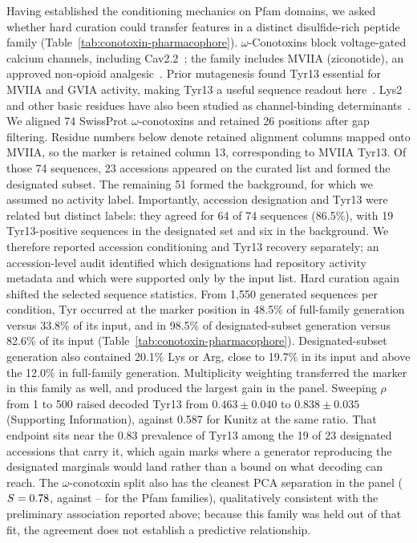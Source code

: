 Having established the conditioning mechanics on Pfam domains, we asked whether hard curation
could transfer features in a distinct disulfide-rich peptide family
(Table~\ref{tab:conotoxin-pharmacophore}). $\omega$-Conotoxins block
voltage-gated calcium channels, including Cav2.2~\cite{omegaConotoxinSAR2006}; the family
includes MVIIA (ziconotide), an approved non-opioid analgesic~\cite{ziconotideReview2004}.
Prior mutagenesis found Tyr13 essential for MVIIA and GVIA activity, making
Tyr13 a useful sequence readout here~\cite{kimTyr13Essential1995}. Lys2 and other basic residues
have also been studied as channel-binding determinants~\cite{satoBasicResidues1993}. We aligned 74 SwissProt
$\omega$-conotoxins and retained 26 positions after gap filtering. Residue numbers below denote
retained alignment columns mapped onto MVIIA, so the marker is retained column 13, corresponding
to MVIIA Tyr13. Of those 74 sequences, 23 accessions
appeared on the curated list and formed the designated subset. The remaining 51 formed the
background, for which we assumed no activity label.
Importantly, accession designation and Tyr13 were related but
distinct labels: they agreed for 64 of 74 sequences (86.5\%), with 19 Tyr13-positive sequences
in the designated set and six in the background. We therefore reported accession conditioning
and Tyr13 recovery separately; an accession-level audit identified which designations had
repository activity metadata and which were supported only by the input list.
Hard curation again shifted the selected sequence statistics. From 1{,}550 generated sequences
per condition, Tyr occurred at the marker position in 48.5\% of full-family generation versus
33.8\% of its input, and in 98.5\% of designated-subset generation versus 82.6\% of its input
(Table~\ref{tab:conotoxin-pharmacophore}). Designated-subset generation also contained 20.1\%
Lys or Arg, close to 19.7\% in its input and above the 12.0\% in full-family generation.
Multiplicity weighting transferred the marker in this family as well, and produced the largest
gain in the panel. Sweeping $\rho$ from 1 to 500 raised decoded Tyr13 from $0.463 \pm 0.040$ to
$0.838 \pm 0.035$ (Supporting Information), against 0.587 for Kunitz at the same ratio. That
endpoint sits near the 0.83 prevalence of Tyr13 among the 19 of 23 designated accessions that
carry it, which again marks where a generator reproducing the designated marginals would land
rather than a bound on what decoding can reach. The $\omega$-conotoxin split also has the
cleanest PCA separation in the panel
($S = 0.78$, against \WWSeparation{}--\HomeoboxSeparation{} for the Pfam
families), qualitatively consistent with the preliminary association reported above; because
this family was held out of that fit, the agreement does not establish a predictive
relationship.

